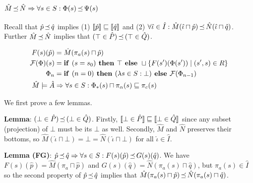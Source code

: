 \subsection{$\hat M \operatorname{\mathrel{\preceq}} \hat N \Rightarrow \forall s \in S : \Phi(s) \operatorname{\mathrel{\preceq}} \Psi(s)$}

Recall that $\hat p \operatorname{\mathrel{\preceq}} \hat q$ implies (1) $\llbracket\hat p\rrbracket \sqsubseteq \llbracket\hat q\rrbracket$ and (2) $\forall \hat \iota \in \hat I : \hat M(\hat \iota \sqcap \hat p) \operatorname{\mathrel{\preceq}} \hat N(\hat \iota \sqcap \hat q)$. Further $\hat M \operatorname{\mathrel{\preceq}} \hat N$ implies that $(\top \in \hat P) \operatorname{\mathrel{\preceq}} \, (\top \in \hat Q)$.

\begin{align*}
F(s)(\hat p) &= \hat M(\pi_{a}(s) \sqcap \hat p) \\
\mathcal{F}(\Phi)(s) &= \textrm{\textbf{if }} (s = s_{0}) \textrm{\textbf{ then }} \top \textrm{\textbf{ else }} \sqcup \{ F(s')(\Phi(s')) \mid (s',s) \in R \} \\
\Phi_{n} &= \textrm{\textbf{if }} (n = 0) \textrm{\textbf{ then }} (\lambda s \in S : \bot) \textrm{\textbf{ else }} \mathcal{F}(\Phi_{n-1}) \\
\hat M \models \hat A &\Rightarrow \forall s \in S : \Phi_{*}(s) \sqcap \pi_{\alpha}(s) \sqsubseteq \pi_{c}(s)
\end{align*}

We first prove a few lemmas.

\textbf{Lemma}: $(\bot \in \hat P) \operatorname{\mathrel{\preceq}} \, (\bot \in \hat Q)$. Firstly, $\llbracket\bot \in \hat P\rrbracket \sqsubseteq \llbracket\bot \in \hat Q\rrbracket$ since any subset (projection) of $\bot$ must be its $\bot$ as well. Secondly, $\hat M$ and $\hat N$ preserves their bottoms, so $\hat M(\hat \iota \sqcap \bot) = \bot = \hat N(\hat \iota \sqcap \bot)$ for all $\hat \iota \in \hat I$.

\textbf{Lemma (FG)}: $\hat p \operatorname{\mathrel{\preceq}} \hat q \Rightarrow \forall s \in S : F(s)(\hat p) \operatorname{\mathrel{\preceq}} G(s)(\hat q)$. We have $F(s)(\hat p) = \hat M(\pi_{a} \sqcap \hat p)$ and $G(s)(\hat q) = \hat N(\pi_{a}(s) \sqcap \hat q)$, but $\pi_{a}(s) \in \hat I$ so the second property of $\hat p \operatorname{\mathrel{\preceq}} \hat q$ implies that $\hat M(\pi_{a}(s) \sqcap \hat p) \operatorname{\mathrel{\preceq}} \hat N(\pi_{a}(s) \sqcap \hat q)$.



